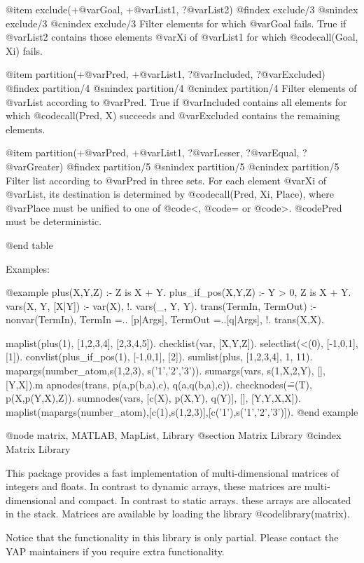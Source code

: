 {{{{{{{{{@item exclude(+@var{Goal}, +@var{List1}, ?@var{List2})
@findex exclude/3
@snindex exclude/3
@cnindex exclude/3
Filter elements for which @var{Goal} fails. True if @var{List2} contains
      those elements @var{Xi} of @var{List1} for which @code{call(Goal, Xi)} fails.

@item partition(+@var{Pred},  +@var{List1}, ?@var{Included}, ?@var{Excluded})
@findex partition/4
@snindex partition/4
@cnindex partition/4
Filter elements of @var{List} according to @var{Pred}. True if
@var{Included} contains all elements for which @code{call(Pred, X)}
succeeds and @var{Excluded} contains the remaining elements.

@item partition(+@var{Pred},  +@var{List1}, ?@var{Lesser}, ?@var{Equal}, ?@var{Greater})
@findex partition/5
@snindex partition/5
@cnindex partition/5
Filter list according to @var{Pred} in three sets. For each element
@var{Xi} of @var{List}, its destination is determined by
@code{call(Pred, Xi, Place)}, where @var{Place} must be unified to one
of @code{<}, @code{=} or @code{>}. @code{Pred} must be deterministic.

@end table

Examples:

@example
plus(X,Y,Z) :- Z is X + Y.
plus_if_pos(X,Y,Z) :- Y > 0, Z is X + Y.
vars(X, Y, [X|Y]) :- var(X), !.
vars(_, Y, Y).
trans(TermIn, TermOut) :-
  nonvar(TermIn),
  TermIn =.. [p|Args],
  TermOut =..[q|Args], !.
trans(X,X).


maplist(plus(1), [1,2,3,4], [2,3,4,5]).
checklist(var, [X,Y,Z]).
selectlist(<(0), [-1,0,1], [1]).
convlist(plus_if_pos(1), [-1,0,1], [2]).
sumlist(plus, [1,2,3,4], 1, 11).
mapargs(number_atom,s(1,2,3), s('1','2','3')).
sumargs(vars, s(1,X,2,Y), [], [Y,X]).m
apnodes(trans, p(a,p(b,a),c), q(a,q(b,a),c)).
checknodes(\==(T), p(X,p(Y,X),Z)).
sumnodes(vars, [c(X), p(X,Y), q(Y)], [], [Y,Y,X,X]).
maplist(mapargs(number_atom),[c(1),s(1,2,3)],[c('1'),s('1','2','3')]).
@end example

@node matrix, MATLAB, MapList, Library
@section Matrix Library
@cindex Matrix Library

This package provides a fast implementation of multi-dimensional
matrices of integers and floats. In contrast to dynamic arrays, these
matrices are multi-dimensional and compact. In contrast to static
arrays. these arrays are allocated in the stack. Matrices are available
by loading the library @code{library(matrix)}.

Notice that the functionality in this library is only partial. Please
contact the YAP maintainers if you require extra functionality.

}}}}}}}}}
